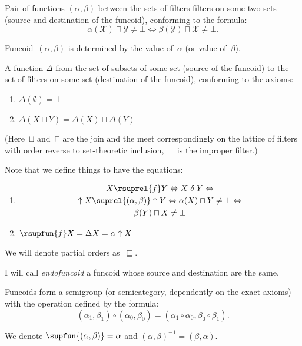 Pair of functions $(\alpha,\beta)$ between the sets of filters filters on some two sets (source and destination of the funcoid), conforming to the formula:
\[ \alpha (\mathcal{X})\sqcap \mathcal{Y}\neq \bot \iff \beta (\mathcal{Y})\sqcap \mathcal{X}\neq \bot. \]

\begin{rem}
Funcoid~$(\alpha,\beta)$ is determined by the value of~$\alpha$ (or value of~$\beta$).
\end{rem}

A function $\Delta$ from the set of subsets of some set (source of the funcoid) to the set of filters on some set (destination of the funcoid), conforming to the axioms:

\begin{enumerate}
\item $\Delta (\emptyset)=\bot$
\item $\Delta (X\sqcup Y)=\Delta (X)\sqcup \Delta (Y)$
\end{enumerate}

(Here~$\sqcup$ and~$\sqcap$ are the join and the meet correspondingly on the lattice of filters with order reverse to set-theoretic inclusion, $\bot$~is the improper filter.)

Note that we define things to have the equations:
\begin{enumerate}
\item
\begin{multline*}
X\rsuprel{f}Y \Leftrightarrow X\mathrel{\delta}Y \Leftrightarrow \\ \uparrow X\suprel{(\alpha,\beta)}\uparrow Y \Leftrightarrow
\alpha (X)\sqcap Y\neq \bot \Leftrightarrow \\ \beta (Y)\sqcap X\neq \bot
\end{multline*}
\item $\rsupfun{f}X = \Delta X = \alpha\uparrow X$
\end{enumerate}

We will denote partial orders as~$\sqsubseteq$.

I will call \emph{endofuncoid} a funcoid whose source and destination are the same.

Funcoids form a semigroup (or semicategory, dependently on the exact axioms) with the operation defined by the formula:
\[ (\alpha _{1},\beta _{1})\circ (\alpha _{0},\beta _{0})=(\alpha _{1}\circ \alpha _{0},\beta _{0}\circ \beta _{1}). \]

We denote $\supfun{(\alpha,\beta)}=\alpha$ and
$(\alpha,\beta)^{-1} = (\beta,\alpha)$.

